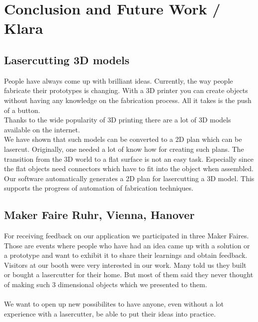 \documentclass[../ClassicThesis.tex]{subfiles}
\begin{document}
\chapter{Conclusion and Future Work / Klara}\label{ch:conclusion}

\section{Lasercutting 3D models}
People have always come up with brilliant ideas. Currently, the way people fabricate their prototypes is changing. With a 3D printer you can create objects without having any knowledge on the fabrication process. All it takes is the push of a button.\\
Thanks to the wide popularity of 3D printing there are a lot of 3D models available on the internet.\\
We have shown that such models can be converted to a 2D plan which can be lasercut. Originally, one needed a lot of know how for creating such plans. The transition from the 3D world to a flat surface is not an easy task. Especially since the flat objects need connectors which have to fit into the object when assembled. \\
Our software automatically generates a 2D plan for lasercutting a 3D model. This supports the progress of automation of fabrication techniques. 

\section{Maker Faire Ruhr, Vienna, Hanover}
For receiving feedback on our application we participated in three Maker Faires. \\
Those are events where people who have had an idea came up with a solution or a prototype and want to exhibit it to share their learnings and obtain feedback.\\
Visitors at our booth were very interested in our work. Many told us they built or bought a lasercutter for their home. But most of them said they never thought of making such 3 dimensional objects which we presented to them. 
\\\*\\
We want to open up new possibilites to have anyone, even without a lot experience with a lasercutter, be able to put their ideas into practice.
\end{document}
